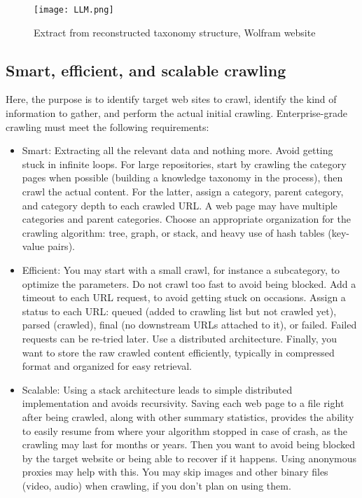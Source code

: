 \documentclass[oneside,10pt]{book}
\begin{document}
\begin{figure}[H]
\centering
\texttt{[image: LLM.png]}   
\caption{Extract from reconstructed taxonomy structure, Wolfram website}
\label{rinyltuag5ttc}
\end{figure}

\subsection{Smart, efficient, and scalable crawling}\label{oudopre}

Here, the purpose is to identify target web sites to crawl, identify the kind of information to gather, and perform the actual 
initial crawling. Enterprise-grade crawling must meet the following requirements:\vspace{1ex}
\begin{itemize}
\item Smart: Extracting all the relevant data and nothing more. Avoid getting stuck in infinite loops. For large repositories, start by crawling the category pages when possible (building a knowledge taxonomy in the process), then crawl the actual content. For the latter, assign a category, parent category, and category depth to each crawled URL. A web page may have multiple categories and parent categories. Choose an appropriate 
 organization for the crawling algorithm: tree, graph, or stack, and heavy use of \textcolor{index}{hash tables} (key-value pairs).
\item Efficient: You may start with a small crawl, for instance a subcategory, to optimize the parameters.
Do not crawl too fast to avoid being blocked. Add a timeout to each URL request, to avoid getting stuck on occasions. 
Assign a status to each URL: queued (added to crawling list but not crawled yet), parsed (crawled), final (no downstream URLs attached to it), or failed. Failed requests can be re-tried later.  Use a distributed architecture. 
Finally, you want to store the raw crawled content efficiently,  typically in compressed format and organized for easy retrieval. 
\item Scalable: Using a stack architecture leads to simple distributed implementation and avoids recursivity. Saving each web page to a file
right after being crawled, along with other summary statistics, 
 provides the ability to easily resume 
 from where your algorithm stopped in case of crash, as the crawling 
may last for months or years. Then you want to avoid being blocked by the target website or being able to recover if it happens. Using anonymous proxies may help with
 this.  You may skip images and other binary files (video, audio) when crawling, if you don't plan on using them.
\end{itemize}
\vspace{1ex}
\end{document}
